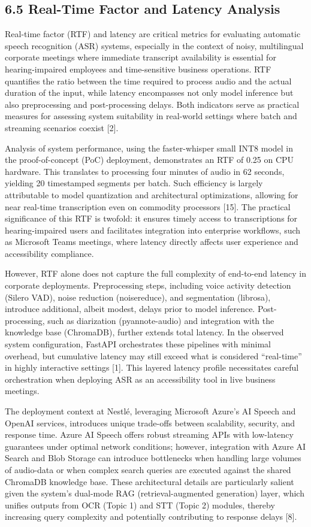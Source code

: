 \documentclass[12pt,a4paper]{article}
\begin{document}
\subsection{6.5 Real-Time Factor and Latency Analysis}


Real-time factor (RTF) and latency are critical metrics for evaluating automatic speech recognition (ASR) systems, especially in the context of noisy, multilingual corporate meetings where immediate transcript availability is essential for hearing-impaired employees and time-sensitive business operations. RTF quantifies the ratio between the time required to process audio and the actual duration of the input, while latency encompasses not only model inference but also preprocessing and post-processing delays. Both indicators serve as practical measures for assessing system suitability in real-world settings where batch and streaming scenarios coexist [2].


Analysis of system performance, using the faster-whisper small INT8 model in the proof-of-concept (PoC) deployment, demonstrates an RTF of 0.25 on CPU hardware. This translates to processing four minutes of audio in 62 seconds, yielding 20 timestamped segments per batch. Such efficiency is largely attributable to model quantization and architectural optimizations, allowing for near real-time transcription even on commodity processors [15]. The practical significance of this RTF is twofold: it ensures timely access to transcriptions for hearing-impaired users and facilitates integration into enterprise workflows, such as Microsoft Teams meetings, where latency directly affects user experience and accessibility compliance.


However, RTF alone does not capture the full complexity of end-to-end latency in corporate deployments. Preprocessing steps, including voice activity detection (Silero VAD), noise reduction (noisereduce), and segmentation (librosa), introduce additional, albeit modest, delays prior to model inference. Post-processing, such as diarization (pyannote-audio) and integration with the knowledge base (ChromaDB), further extends total latency. In the observed system configuration, FastAPI orchestrates these pipelines with minimal overhead, but cumulative latency may still exceed what is considered “real-time” in highly interactive settings [1]. This layered latency profile necessitates careful orchestration when deploying ASR as an accessibility tool in live business meetings.


The deployment context at Nestlé, leveraging Microsoft Azure’s AI Speech and OpenAI services, introduces unique trade-offs between scalability, security, and response time. Azure AI Speech offers robust streaming APIs with low-latency guarantees under optimal network conditions; however, integration with Azure AI Search and Blob Storage can introduce bottlenecks when handling large volumes of audio-data or when complex search queries are executed against the shared ChromaDB knowledge base. These architectural details are particularly salient given the system’s dual-mode RAG (retrieval-augmented generation) layer, which unifies outputs from OCR (Topic 1) and STT (Topic 2) modules, thereby increasing query complexity and potentially contributing to response delays [8].
\end{document}
